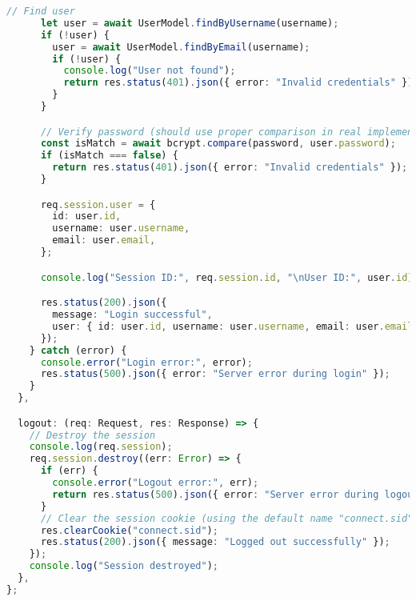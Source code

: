 \begin{lstlisting}[language=TypeScript]
      // Find user
      let user = await UserModel.findByUsername(username);
      if (!user) {
        user = await UserModel.findByEmail(username);
        if (!user) {
          console.log("User not found");
          return res.status(401).json({ error: "Invalid credentials" });
        }
      }

      // Verify password (should use proper comparison in real implementation)
      const isMatch = await bcrypt.compare(password, user.password);
      if (isMatch === false) {
        return res.status(401).json({ error: "Invalid credentials" });
      }

      req.session.user = {
        id: user.id,
        username: user.username,
        email: user.email,
      };

      console.log("Session ID:", req.session.id, "\nUser ID:", user.id);

      res.status(200).json({
        message: "Login successful",
        user: { id: user.id, username: user.username, email: user.email },
      });
    } catch (error) {
      console.error("Login error:", error);
      res.status(500).json({ error: "Server error during login" });
    }
  },

  logout: (req: Request, res: Response) => {
    // Destroy the session
    console.log(req.session);
    req.session.destroy((err: Error) => {
      if (err) {
        console.error("Logout error:", err);
        return res.status(500).json({ error: "Server error during logout" });
      }
      // Clear the session cookie (using the default name "connect.sid")
      res.clearCookie("connect.sid");
      res.status(200).json({ message: "Logged out successfully" });
    });
    console.log("Session destroyed");
  },
};
\end{lstlisting}

